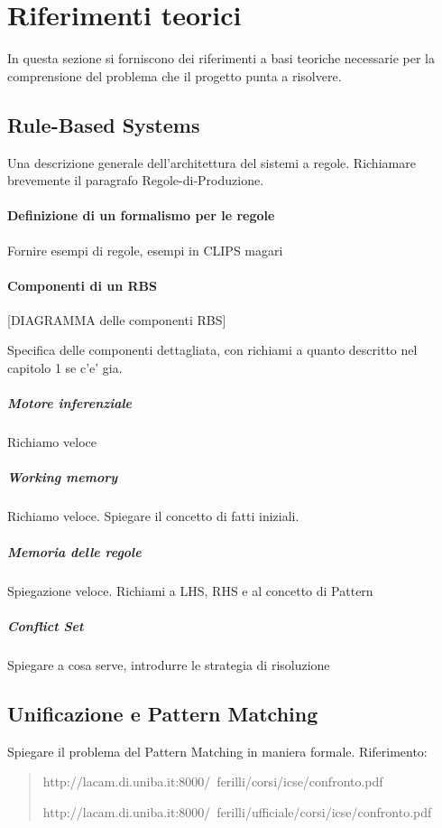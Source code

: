 \section{Riferimenti teorici}

In questa sezione si forniscono dei riferimenti a basi teoriche necessarie per la comprensione del problema che il progetto punta a risolvere.


\subsection{Rule-Based Systems}

Una descrizione generale dell'architettura del sistemi a regole. Richiamare brevemente il paragrafo Regole-di-Produzione.

\paragraph{Definizione di un formalismo per le regole}

Fornire esempi di regole, esempi in CLIPS magari

\paragraph{Componenti di un RBS}

[DIAGRAMMA delle componenti RBS]

Specifica delle componenti dettagliata, con richiami a quanto descritto nel capitolo 1 se c'e' gia.

\subparagraph{Motore inferenziale}

Richiamo veloce

\subparagraph{Working memory}

Richiamo veloce. Spiegare il concetto di fatti iniziali.

\subparagraph{Memoria delle regole}

Spiegazione veloce. Richiami a LHS, RHS e al concetto di Pattern

\subparagraph{Conflict Set}

Spiegare a cosa serve, introdurre le strategia di risoluzione

\subsection{Unificazione e Pattern Matching}

Spiegare il problema del Pattern Matching in maniera formale. Riferimento: \begin{verse}
http://lacam.di.uniba.it:8000/~ferilli/corsi/icse/confronto.pdf

http://lacam.di.uniba.it:8000/~ferilli/ufficiale/corsi/icse/confronto.pdf
\end{verse}

